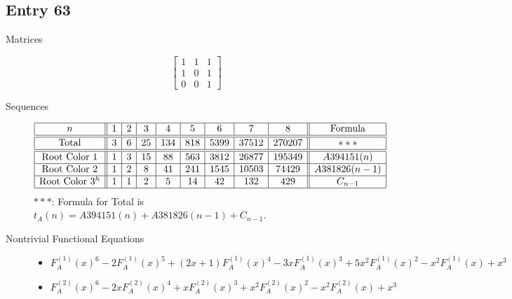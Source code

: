 \documentclass[12pt]{amsart}
\newcommand{\gff}[2]{F_{#2}^{(#1)}(x)}
\newcommand{\gfa}[1]{\gff{#1}{A}}
\begin{document}
\subsection*{Entry 63}
\begin{description}
    \item[Matrices]
    
    \[\begin{bmatrix}
1 & 1 & 1 \\
1 & 0 & 1 \\
0 & 0 & 1
\end{bmatrix}\]
    \item[Sequences]\hspace*{\fill}\vspace{-0.5cm}
    \begin{center}
        \[
        \begin{array}{|c||c|c|c|c|c|c|c|c||c|}\hline
           n  & 1 & 2 & 3 & 4 & 5 & 6 & 7 & 8  & \text{Formula}\\\hline\hline
           \text{Total}  & 3 & 6 & 25 & 134 & 818 & 5399 & 37512 & 270207 & *** \\\hline\hline
           \text{Root Color }1 & 1 & 3 & 15 & 88 & 563 & 3812 & 26877 & 195349 & A394151(n)\\\hline
           \text{Root Color }2 & 1 & 2 & 8 & 41 & 241 & 1545 & 10503 & 74429 & A381826(n-1)\\\hline
           \text{Root Color }3^{h} & 1 & 1 & 2 & 5 & 14 & 42 & 132 & 429 & C_{n-1}\\\hline
        \end{array}
        \]
        $***$: Formula for Total is $t_A(n)=A394151(n)+A381826(n-1)+C_{n-1}$.
    \end{center}
    
    \item[Nontrivial Functional Equations]\hspace*{\fill}

    \begin{itemize}
\item $\gfa{1}^6-2\gfa{1}^5+(2x + 1)\gfa{1}^4-3x\gfa{1}^3+5x^2\gfa{1}^2-x^2\gfa{1}+x^3$


\item $\gfa{2}^6-2x\gfa{2}^4+x\gfa{2}^3+x^2\gfa{2}^2-x^2\gfa{2}+x^3$


\end{itemize}
\end{description}
\end{document}
